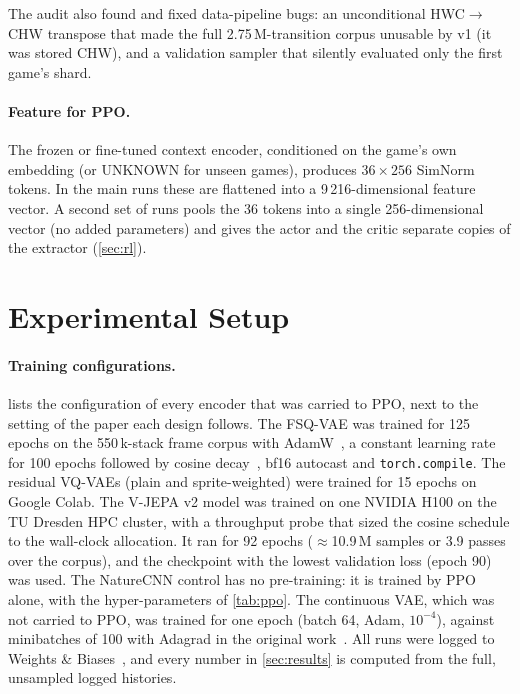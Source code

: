 \documentclass[runningheads]{llncs}
\begin{document}
The audit also found and fixed data-pipeline bugs: an unconditional HWC$\to$CHW transpose
that made the full 2.75\,M-transition corpus unusable by v1 (it was stored CHW), and a
validation sampler that silently evaluated only the first game's shard.

\paragraph{Feature for PPO.}
The frozen or fine-tuned context encoder, conditioned on the game's own embedding (or
UNKNOWN for unseen games), produces $36\times256$ SimNorm tokens. In the main runs
these are flattened into a 9\,216-dimensional feature vector. A second set of runs
pools the 36 tokens into a single 256-dimensional vector (no added parameters) and gives
the actor and the critic separate copies of the extractor (\cref{sec:rl}).

\section{Experimental Setup}
\label{sec:setup}

\paragraph{Training configurations.}
 lists the configuration of every encoder that was carried to PPO,
next to the setting of the paper each design follows. The FSQ-VAE was trained for 125
epochs on the 550\,k-stack frame corpus with AdamW~\cite{loshchilov2019adamw}, a constant
learning rate for 100 epochs followed by cosine decay~\cite{loshchilov2017sgdr}, bf16
autocast and \texttt{torch.compile}. The residual VQ-VAEs (plain and sprite-weighted) were
trained for 15 epochs on Google Colab. The V-JEPA v2 model was trained on one NVIDIA H100
on the TU Dresden HPC cluster, with a throughput probe that sized the cosine schedule to
the wall-clock allocation. It ran for 92 epochs ($\approx$10.9\,M samples or 3.9 passes
over the corpus), and the checkpoint with the lowest validation loss (epoch 90) was used.
The NatureCNN control has no pre-training: it is trained by PPO alone, with the
hyper-parameters of \cref{tab:ppo}. The continuous VAE, which was not carried to PPO, was
trained for one epoch (batch 64, Adam, $10^{-4}$), against minibatches of 100 with Adagrad
in the original work~\cite{kingma2014vae}. All runs were logged to Weights \&
Biases~\cite{biewald2020wandb}, and every number in \cref{sec:results} is computed from
the full, unsampled logged histories.
\end{document}
